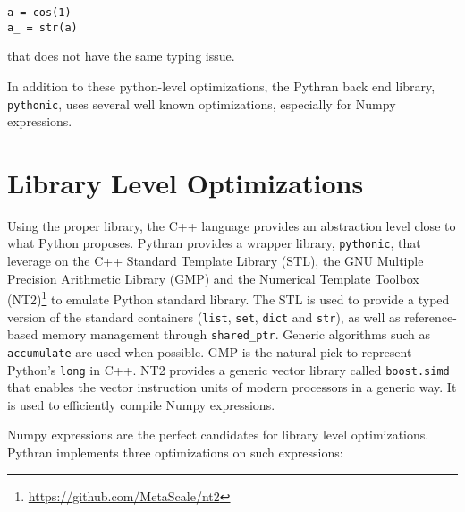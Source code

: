 \documentclass[10pt, onecolumn, preprint]{sigplanconf}
\begin{document}
\begin{lstlisting}
a = cos(1)
a_ = str(a)
\end{lstlisting}

that does not have the same typing issue.

In addition to these python-level optimizations, the Pythran back end library,
\texttt{pythonic}, uses several well known optimizations, especially for Numpy
expressions.

\section{Library Level Optimizations}
\label{sec:backend}

Using the proper library, the C++ language provides an abstraction level close
to what Python proposes. Pythran provides a wrapper library, \texttt{pythonic},
that leverage on the C++ Standard Template Library (STL), the GNU Multiple
Precision Arithmetic Library (GMP) and the Numerical Template Toolbox
(NT2)\footnote{\url{https://github.com/MetaScale/nt2}} to emulate Python
standard library. The STL is used to provide a typed version of the standard
containers (\texttt{list}, \texttt{set}, \texttt{dict} and \texttt{str}), as
well as reference-based memory management through \texttt{shared\_ptr}. Generic
algorithms such as \texttt{accumulate} are used when possible. GMP is the
natural pick to represent Python's \texttt{long} in C++. NT2 provides a generic
vector library called \texttt{boost.simd}\cite{esterie2012boost} that enables
the vector instruction units of modern processors in a generic way. It is used
to efficiently compile Numpy expressions.

Numpy expressions are the perfect candidates for library level optimizations.
Pythran implements three optimizations on such expressions:
\end{document}
